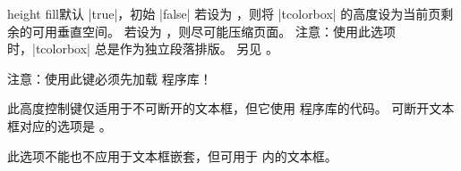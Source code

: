 \clearpage
\begin{docTcbKey}[][doc new and updated={2014-09-22}{2016-02-17}]{height fill}{}{默认 |true|，初始 |false|}
若设为 ，则将 |tcolorbox| 的高度设为当前页剩余的可用垂直空间。
若设为 ，则尽可能压缩页面。
注意：使用此选项时，|tcolorbox| 总是作为独立段落排版。
另见 。
\begin{marker}
注意：使用此键必须先加载  程序库！
\end{marker}
此高度控制键仅适用于不可断开的文本框，但它使用  程序库的代码。
可断开文本框对应的选项是 。

此选项不能也不应用于文本框嵌套，但可用于  内的文本框。

\begin{dispListing}
\begin{tcolorbox}[height fill,
  colback=red!5!white,colframe=red!75!black,fonttitle=\bfseries,
  title=Box which fills the rest of the page]
\lipsum[1]
\end{tcolorbox}
\end{dispListing}
\end{docTcbKey}
{\tcbusetemp}


